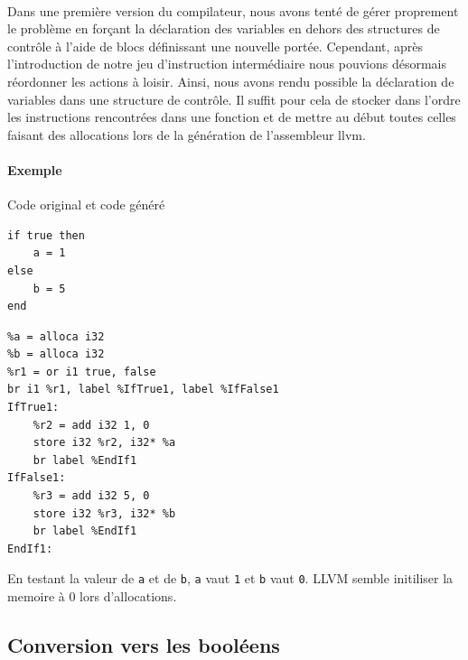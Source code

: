 \documentclass[12pt]{article}
\begin{document}
\paragraph{} Dans une première version du compilateur, nous avons tenté de gérer proprement le problème en forçant la déclaration des variables en dehors des structures de contrôle à l'aide de blocs définissant une nouvelle portée. Cependant, après l'introduction de notre jeu d'instruction intermédiaire nous pouvions désormais réordonner les actions à loisir. Ainsi, nous avons rendu possible la déclaration de variables dans une structure de contrôle. Il suffit pour cela de stocker dans l'ordre les instructions rencontrées dans une fonction et de mettre au début toutes celles faisant des allocations lors de la génération de l'assembleur llvm.

\paragraph{Exemple} Code original et code généré

\vspace{0.5cm}

\begin{minipage}{0.48\textwidth}
\begin{verbatim}
if true then
    a = 1
else
    b = 5
end
\end{verbatim}
\end{minipage}
\begin{minipage}{0.48\textwidth}
\begin{verbatim}
%a = alloca i32
%b = alloca i32
%r1 = or i1 true, false
br i1 %r1, label %IfTrue1, label %IfFalse1
IfTrue1:
    %r2 = add i32 1, 0
    store i32 %r2, i32* %a
    br label %EndIf1
IfFalse1:
    %r3 = add i32 5, 0
    store i32 %r3, i32* %b
    br label %EndIf1
EndIf1:
\end{verbatim}
\end{minipage}

\vspace{0.5cm}

En testant la valeur de \verb!a! et de \verb!b!, \verb!a! vaut \verb!1! et \verb!b! vaut \verb!0!. LLVM semble initiliser la memoire à 0 lors d'allocations.

\subsection{Conversion vers les booléens}
\end{document}
